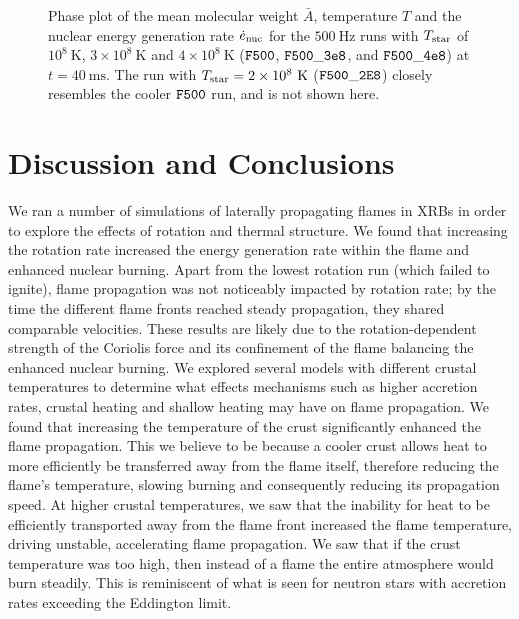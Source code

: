 \documentclass[preprint,times,tighten]{aastex63}
\begin{document}
\begin{figure}[t]
    \centering
    \caption{\label{fig:abar_hot}Phase plot of the mean molecular weight $\bar{A}$, temperature $T$ and the nuclear energy generation rate $\dot{e}_{\rm nuc}$ for the $500~\mathrm{Hz}$ runs with $T_{\rm star}$ of $10^8~\mathrm{K}$, $3\times10^8~\mathrm{K}$ and $4\times10^8~\mathrm{K}$ ($\tt{F500}$, $\tt{F500\_3e8}$, and $\tt{F500\_4e8}$) at $t = 40~\mathrm{ms}$. The run with $T_{\rm star} = 2\times10^8~\mathrm{K}$ ($\tt{F500\_2E8}$) closely resembles the cooler $\tt{F500}$ run, and is not shown here.}
\end{figure}

\section{Discussion and Conclusions}\label{Sec:conclusions}

We ran a number of simulations of laterally propagating flames in XRBs in order to explore the effects of rotation and thermal structure. We found that increasing the rotation rate increased the energy generation rate within the flame and enhanced nuclear burning. Apart from the lowest rotation run (which failed to ignite), flame propagation was not noticeably impacted by rotation rate; by the time the different flame fronts reached steady propagation, they shared comparable velocities. These results are likely due to the rotation-dependent strength of the Coriolis force and its confinement of the flame balancing the enhanced nuclear burning. We explored several models with different crustal temperatures to determine what effects mechanisms such as higher accretion rates, crustal heating and shallow heating may have on flame propagation. We found that increasing the temperature of the crust significantly enhanced the flame propagation. This we believe to be because a cooler crust allows heat to more efficiently be transferred away from the flame itself, therefore reducing the flame's temperature, slowing burning and consequently reducing its propagation speed. At higher crustal temperatures, we saw that the inability for heat to be efficiently transported away from the flame front increased the flame temperature, driving unstable, accelerating flame propagation. We saw that if the crust temperature was too high, then instead of a flame the entire atmosphere would burn steadily. This is reminiscent of what is seen for neutron stars with accretion rates exceeding the Eddington limit.
\end{document}
